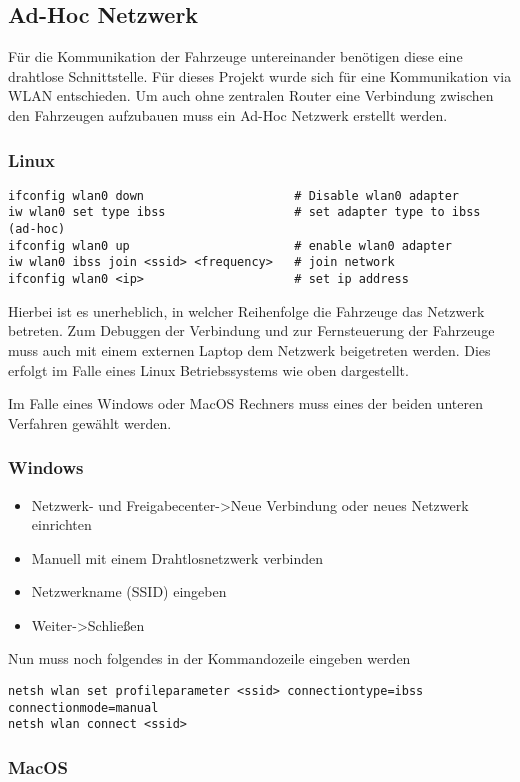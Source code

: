 \documentclass[a4paper, 12pt, titlepage]{scrartcl}
\begin{document}
	\subsection{Ad-Hoc Netzwerk}
	Für die Kommunikation der Fahrzeuge untereinander benötigen diese eine drahtlose Schnittstelle. Für dieses 
	Projekt wurde sich für eine Kommunikation via WLAN entschieden. Um auch ohne zentralen Router eine Verbindung 
	zwischen den Fahrzeugen aufzubauen muss ein Ad-Hoc Netzwerk erstellt werden.
	\subsubsection*{Linux}
	\begin{lstlisting}
ifconfig wlan0 down 					# Disable wlan0 adapter
iw wlan0 set type ibss					# set adapter type to ibss (ad-hoc)
ifconfig wlan0 up						# enable wlan0 adapter
iw wlan0 ibss join <ssid> <frequency>	# join network
ifconfig wlan0 <ip>						# set ip address
	\end{lstlisting}
	Hierbei ist es unerheblich, in welcher Reihenfolge die Fahrzeuge das Netzwerk betreten. 
	Zum Debuggen der Verbindung und zur Fernsteuerung der Fahrzeuge muss auch mit einem externen Laptop dem 
	Netzwerk beigetreten werden. Dies erfolgt im Falle eines Linux Betriebssystems wie oben dargestellt.
	
	Im Falle eines Windows oder MacOS Rechners muss eines der beiden unteren Verfahren gewählt werden.
	\subsubsection*{Windows}	
	\begin{itemize}
	\item Netzwerk- und Freigabecenter->Neue Verbindung oder neues Netzwerk einrichten
	\item Manuell mit einem Drahtlosnetzwerk verbinden
	\item Netzwerkname (SSID) eingeben
	\item Weiter->Schließen
	\end{itemize}
	Nun muss noch folgendes in der Kommandozeile eingeben werden
	\begin{lstlisting}
netsh wlan set profileparameter <ssid> connectiontype=ibss connectionmode=manual
netsh wlan connect <ssid>
	\end{lstlisting}
	\subsubsection*{MacOS}
\end{document}

